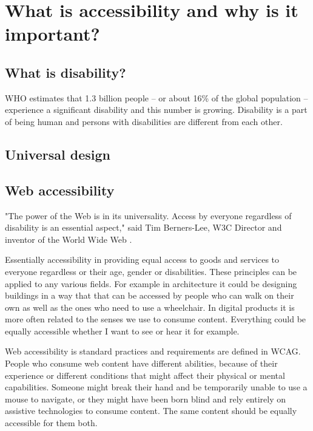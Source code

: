 \documentclass{master_thesis_section}
\begin{document}
\section{What is accessibility and why is it important?}

\subsection{What is disability?}
WHO estimates that 1.3 billion people – or about 16\% of the global population – experience a significant disability and this number is growing. Disability is a part of being human and persons with disabilities are different from each other. \cite{WHODisability2022} \\

\subsection{Universal design}
\subsection{Web accessibility}

"The power of the Web is in its universality. Access by everyone regardless of disability is an essential aspect," said Tim Berners-Lee, W3C Director and inventor of the World Wide Web \cite{worldwidewebconsortium1997}.

Essentially accessibility in providing equal access to goods and services to everyone regardless or their age, gender or disabilities. These principles can be applied to any various fields. For example in architecture it could be designing buildings in a way that that can be accessed by people who can walk on their own as well as the ones who need to use a wheelchair. In digital products it is more often related to the senses we use to consume content. Everything could be equally accessible whether I want to see or hear it for example.

Web accessibility is standard practices and requirements are defined in WCAG. People who consume web content have different abilities, because of their experience or different conditions that might affect their physical or mental capabilities. Someone might break their hand and be temporarily unable to use a mouse to navigate, or they might have been born blind and rely entirely on assistive technologies to consume content. The same content should be equally accessible for them both.
\end{document}
